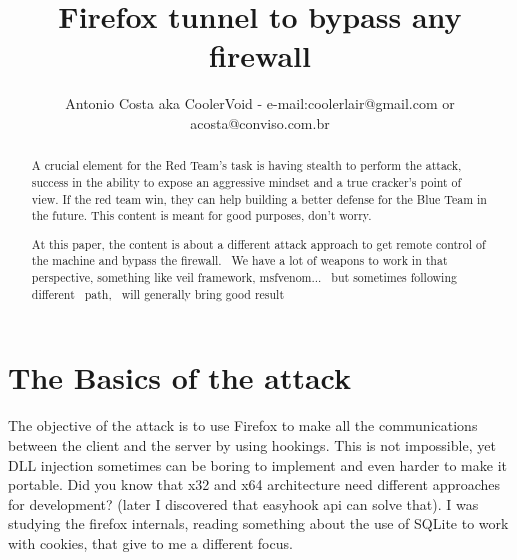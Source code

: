 \documentclass[tog]{acmsiggraph}
\title{Firefox tunnel to bypass any firewall}
\author{Antonio Costa aka CoolerVoid -  {e-mail:coolerlair@gmail.com or acosta@conviso.com.br}}
\begin{document}


\maketitle

\begin{abstract}

A crucial element for the Red Team’s task is having stealth to perform the attack, success in the ability to expose an aggressive mindset and a true cracker’s point of view. If the red team win, they can help building a better defense for the Blue Team in the future. This content is meant for good purposes, don't worry.

At this paper, the content is about a different attack approach to get remote control of the machine and bypass the firewall.  We have a lot of weapons to work in that perspective, something like veil framework, msfvenom...  but sometimes following different  path,  will generally bring good result
\end{abstract}



\keywordlist



\section{The Basics of the attack }
The objective of the attack is to use Firefox to make all the communications between the client and the server by using hookings. This is not impossible, yet DLL injection sometimes can be boring to implement and even harder to make it portable. Did you know that x32 and x64 architecture need different approaches for development? (later I discovered that easyhook api can solve that). 
I was studying the firefox internals, reading something about the use of SQLite to work with cookies, that give to me a different focus.
\end{document}
